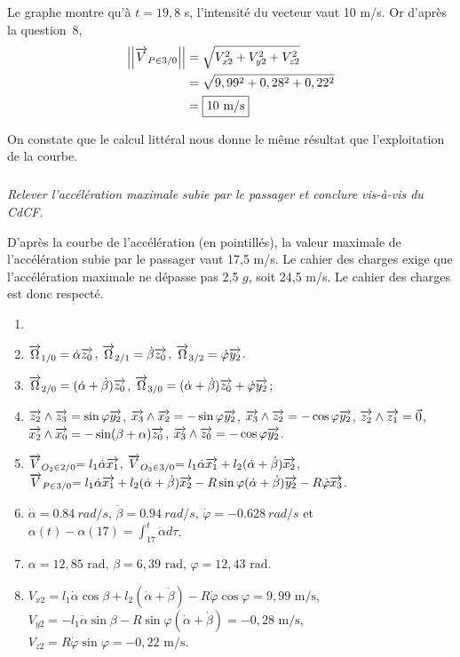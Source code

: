 \documentclass[10pt,fleqn]{article} %
\begin{document}
\begin{multicols}{2}
\begin{corrige}
Le graphe montre qu'à $t=19,8$ s, l'intensité du vecteur  vaut 10 m/s. Or  d'après la question~8, 
\begin{align*}
\left|\left|\overrightarrow{V}_{P\in 3 / 0}\right|\right|&=\sqrt{V_{x2}^2+V_{y2}^2+V_{z2}^2}\\
	&=\sqrt{9,99^2+0,28^2+0,22^2}\\
	&=\boxed{10\text{ m/s} }
\end{align*}

On constate que le calcul littéral nous donne le même résultat que l'exploitation de la courbe.

\end{corrige}\else\fi

\subparagraph{}
\textit{Relever l'accélération maximale subie par le passager et conclure vis-à-vis du CdCF.}
\ifprof
\begin{corrige}
D'après la courbe de l'accélération (en pointillés), la valeur maximale de l'accélération subie par le passager vaut 17,5 m/s. Le cahier des charges exige que l'accélération maximale ne dépasse pas 2,5 $g$, soit 24,5 m/s. Le cahier des charges est donc respecté.

\end{corrige}\else\fi



\begin{enumerate}
\item $\;$
\item $\overrightarrow{\Omega}_{1 / 0}=\dot\alpha\overrightarrow{z_0}$, $\overrightarrow{\Omega}_{2 / 1}=\dot\beta\overrightarrow{z_0}$, $\overrightarrow{\Omega}_{3 / 2}=\dot\varphi\overrightarrow{y_2}$.
\item $\overrightarrow{\Omega}_{2 / 0}=(\dot\alpha+\dot\beta)\overrightarrow{z_0}$, $\overrightarrow{\Omega}_{3 / 0}=(\dot\alpha+\dot\beta)\overrightarrow{z_0}+\dot\varphi\overrightarrow{y_2}$;
\item 
$\overrightarrow{z_2} \wedge \overrightarrow{z_3} =\sin\varphi \overrightarrow{y_2}$,
$\overrightarrow{x_3} \wedge \overrightarrow{x_2} = -\sin\varphi \overrightarrow{y_2}$,
$\overrightarrow{x_3} \wedge \overrightarrow{z_2}=-\cos\varphi\overrightarrow{y_2}$,
$\overrightarrow{z_2} \wedge \overrightarrow{z_1}= \vec{0}$,
$\overrightarrow{x_2} \wedge \overrightarrow{x_0}=-\sin(\beta+\alpha)\overrightarrow{z_0}$,
$\overrightarrow{x_3}\wedge\overrightarrow{z_0} =-\cos\varphi\overrightarrow{y_2}$.
\item 
${\overrightarrow{V}_{O_2\in 2 / 0}}{= l_1\dot\alpha\overrightarrow{x_{1}}}$,
${\overrightarrow{V}_{O_3\in 3 / 0}}{=l_1\dot\alpha\overrightarrow{x_{1}}+l_2(\dot\alpha+\dot\beta)\overrightarrow{x_2}}$,
${\overrightarrow{V}_{P\in 3 / 0}}{=l_1\dot\alpha\overrightarrow{x_{1}}+l_2(\dot\alpha+\dot\beta)\overrightarrow{x_2}-R\sin\varphi(\dot\alpha+\dot\beta)\overrightarrow{y_2}-R\dot\varphi\overrightarrow{x_3}}$.

\item ${\dot\alpha}{=\SI{0,84}{rad/s}}$, ${\dot\beta}{=\SI{0,94}{rad/s}}$, ${\dot\varphi}{=-\SI{0,628}{rad/s}}$ et $\alpha (t)-\alpha(17)=\int_{17}^t \dot\alpha d\tau$.
\item $\alpha=\boxed{12,85\text{ rad}}$, $\beta= \boxed{6,39\text{ rad}}$, $\varphi = \boxed{12,43\text{ rad}}$.
\item ${V_{x2}}{=l_1 \dot\alpha\cos\beta+l_2 (\dot\alpha+\dot\beta) -R \dot\varphi\cos\varphi}=\boxed{9,99\text{ m/s}}$, 
${V_{y2}}{=-l_1\dot\alpha\sin\beta-R\sin\varphi(\dot\alpha+\dot\beta)}=\boxed{-0,28\text{ m/s}}$,
$ {V_{z2}}{=R\dot\varphi\sin\varphi} =\boxed{-0,22 \text{ m/s}}$.


\end{enumerate}
\end{multicols}
\end{document}
